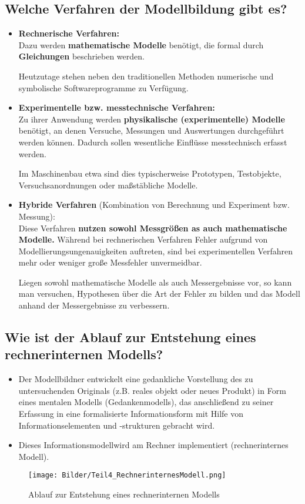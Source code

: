 \subsection{Welche Verfahren der Modellbildung gibt es?}
\begin{itemize}
    \item \textbf{Rechnerische Verfahren:}\\
    Dazu werden \textbf{mathematische Modelle} benötigt, die formal durch \textbf{Gleichungen} beschrieben werden.
    
    Heutzutage stehen neben den traditionellen Methoden numerische und symbolische Softwareprogramme zu Verfügung.
    
    \item \textbf{Experimentelle bzw. messtechnische Verfahren:}\\
    Zu ihrer Anwendung werden \textbf{physikalische (experimentelle) Modelle} benötigt, an denen Versuche, Messungen und Auswertungen
    durchgeführt werden können. Dadurch sollen wesentliche Einflüsse messtechnisch erfasst werden.
    
    Im Maschinenbau etwa sind dies typischerweise Prototypen, Testobjekte, Versuchsanordnungen oder
    maßstäbliche Modelle.

    \item \textbf{Hybride Verfahren} (Kombination von Berechnung und Experiment bzw. Messung):\\
    Diese Verfahren \textbf{nutzen sowohl Messgrößen as auch mathematische Modelle.} Während bei rechnerischen Verfahren Fehler aufgrund
    von Modellierungsungenauigkeiten auftreten, sind bei experimentellen Verfahren mehr oder weniger große Messfehler unvermeidbar.
    
    Liegen sowohl mathematische Modelle als auch Messergebnisse vor, so kann man versuchen, Hypothesen über die Art der Fehler 
    zu bilden und das Modell anhand der Messergebnisse zu verbessern.
\end{itemize}

\subsection{Wie ist der Ablauf zur Entstehung eines rechnerinternen Modells?}
\begin{itemize}
    \item Der Modellbildner entwickelt eine gedankliche Vorstellung des zu untersuchenden Originals (z.B. reales
    objekt oder neues Produkt) in Form eines mentalen Modells (Gedankenmodells), das anschließend 
    zu seiner Erfassung in eine formalisierte Informationsform mit Hilfe von Informationselementen und -strukturen gebracht wird.
    \item Dieses \glqq Informationsmodell\grqq wird am Rechner implementiert (rechnerinternes Modell).
\end{itemize}
\begin{figure}[H]
    \centering
    \texttt{[image: Bilder/Teil4\_RechnerinternesModell.png]}
    \caption{Ablauf zur Entstehung eines rechnerinternen Modells}
\end{figure}

